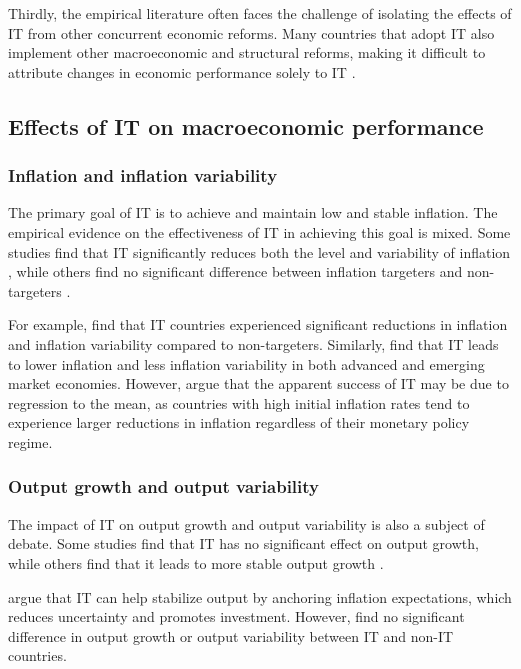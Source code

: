 \documentclass{article}
\begin{document}
Thirdly, the empirical literature often faces the challenge of isolating the effects of IT from other concurrent economic reforms. Many countries that adopt IT also implement other macroeconomic and structural reforms, making it difficult to attribute changes in economic performance solely to IT \citep{BatiniLaxton2007}.

\subsection{Effects of IT on macroeconomic performance}

\subsubsection{Inflation and inflation variability}

The primary goal of IT is to achieve and maintain low and stable inflation. The empirical evidence on the effectiveness of IT in achieving this goal is mixed. Some studies find that IT significantly reduces both the level and variability of inflation \citep{MishkinSchmidtHebbel2007}, while others find no significant difference between inflation targeters and non-targeters \citep{BallSheridan2005}.

For example, \citet{bernankeetal1999} find that IT countries experienced significant reductions in inflation and inflation variability compared to non-targeters. Similarly, \citet{vegawinkelried2005} find that IT leads to lower inflation and less inflation variability in both advanced and emerging market economies. However, \citet{ballsheridan2005} argue that the apparent success of IT may be due to regression to the mean, as countries with high initial inflation rates tend to experience larger reductions in inflation regardless of their monetary policy regime.

\subsubsection{Output growth and output variability}

The impact of IT on output growth and output variability is also a subject of debate. Some studies find that IT has no significant effect on output growth, while others find that it leads to more stable output growth \citep{Roger2010}.

\citet{mishkinsavastano2001} argue that IT can help stabilize output by anchoring inflation expectations, which reduces uncertainty and promotes investment. However, \citet{ballsheridan2005} find no significant difference in output growth or output variability between IT and non-IT countries.
\end{document}
